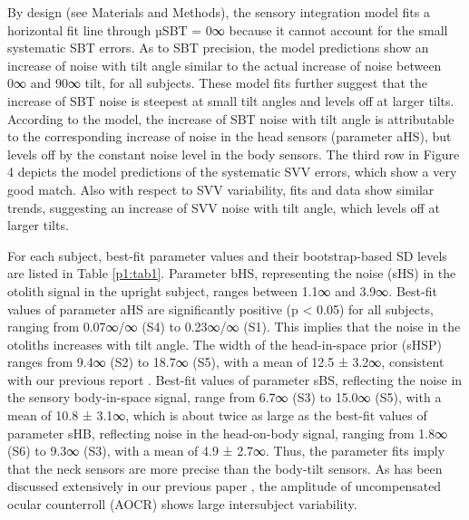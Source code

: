 By design (see Materials and Methods), the sensory integration model fits a horizontal fit line through µSBT = 0∞ because it cannot account for the small systematic SBT errors. As to SBT precision, the model predictions show an increase of noise with tilt angle similar to the actual increase of noise between 0∞ and 90∞ tilt, for all subjects. These model fits further suggest that the increase of SBT noise is steepest at small tilt angles and levels off at larger tilts. According to the model, the increase of SBT noise with tilt angle is attributable to the corresponding increase of noise in the head sensors (parameter aHS), but levels off by the constant noise level in the body sensors. The third row in Figure 4 depicts the model predictions of the systematic SVV errors, which show a very good match. Also with respect to SVV variability, fits and data show similar trends, suggesting an increase of SVV noise with tilt angle, which levels off at larger tilts. 

For each subject, best-fit parameter values and their bootstrap-based SD levels are listed in Table \ref{p1:tab1}. Parameter bHS, representing the noise (sHS) in the otolith signal in the upright subject, ranges between 1.1∞ and 3.9∞. Best-fit values of parameter aHS are significantly positive (p < 0.05) for all subjects, ranging from 0.07∞/∞ (S4) to 0.23∞/∞ (S1). This implies that the noise in the otoliths increases with tilt angle. The width of the head-in-space prior (sHSP) ranges from 9.4∞ (S2) to 18.7∞ (S5), with a mean of 12.5 ± 3.2∞, consistent with our previous report \cite{devrijer2009}. Best-fit values of parameter sBS, reflecting the noise in the sensory body-in-space signal, range from 6.7∞ (S3) to 15.0∞ (S5), with a mean of 10.8 ± 3.1∞, which is about twice as large as the best-fit values of parameter sHB, reflecting noise in the head-on-body signal, ranging from 1.8∞ (S6) to 9.3∞ (S3), with a mean of 4.9 ± 2.7∞. Thus, the parameter fits imply that the neck sensors are more precise than the body-tilt sensors. As has been discussed extensively in our previous paper \cite{devrijer2009}, the amplitude of uncompensated ocular counterroll (AOCR) shows large intersubject variability. 

